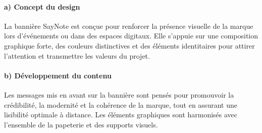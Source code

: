 \paragraph*{a) Concept du design}
La bannière SayNote est conçue pour renforcer la présence visuelle de la marque lors d’événements ou dans des espaces digitaux. Elle s’appuie sur une composition graphique forte, des couleurs distinctives et des éléments identitaires pour attirer l’attention et transmettre les valeurs du projet.

\paragraph*{b) Développement du contenu}
Les messages mis en avant sur la bannière sont pensés pour promouvoir la crédibilité, la modernité et la cohérence de la marque, tout en assurant une lisibilité optimale à distance. Les éléments graphiques sont harmonisés avec l’ensemble de la papeterie et des supports visuels.

